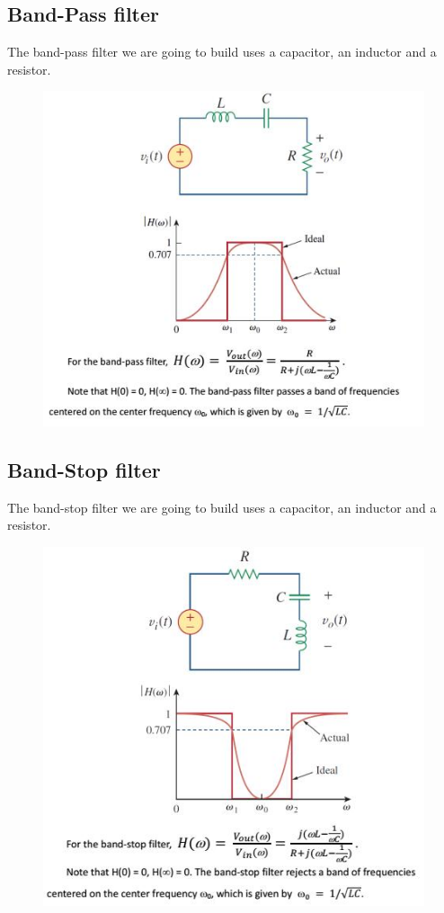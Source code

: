 \documentclass{article}
\begin{document}
\subsection{Band-Pass filter}
The band-pass filter we are going to build uses a capacitor, an inductor and a resistor.
  \begin{figure}[H]
  \centering
  \includegraphics[width=.8\textwidth]{Figure5.jpg}
  \label{img} 
\end{figure}
\subsection{Band-Stop filter}
The band-stop filter we are going to build uses a capacitor, an inductor and a resistor.
  \begin{figure}[H]
  \centering
  \includegraphics[width=.8\textwidth]{Figure6.jpg}
  \label{img} 
\end{figure}
\end{document}
